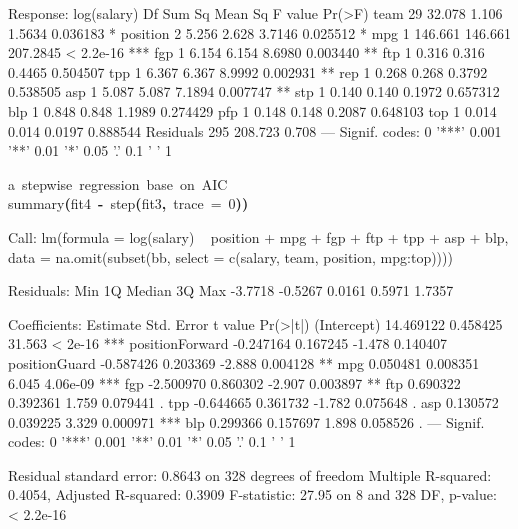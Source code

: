 \documentclass[english]{article}
\newenvironment{dummy}{\par}{\par}
\newcommand{\hlnumber}[1]{\textcolor[rgb]{0.0823529411764706,0.0784313725490196,0.709803921568627}{#1}}%
\newcommand{\hlfunctioncall}[1]{\textcolor[rgb]{1,0,0}{#1}}%
\newcommand{\hlkeyword}[1]{\textcolor[rgb]{0,0,0}{\textbf{#1}}}%
\newcommand{\hlargument}[1]{\textcolor[rgb]{0.694117647058824,0.247058823529412,0.0196078431372549}{#1}}%
\newcommand{\hlcomment}[1]{\textcolor[rgb]{0.8,0.8,0.8}{#1}}%
\newcommand{\hlassignement}[1]{\textcolor[rgb]{0.215686274509804,0.215686274509804,0.384313725490196}{\textbf{#1}}}%
\newcommand{\hlsymbol}[1]{\textcolor[rgb]{0,0,0}{#1}}%
\newcommand{\hlprompt}[1]{\textcolor[rgb]{0,0,0}{#1}}%
\newcommand{\hlstd}[1]{\textcolor[rgb]{0,0,0}{#1}}%
\begin{document}
\begin{dummy}
\begin{Schunk}
\begin{Soutput}
Response: log(salary)
           Df  Sum Sq Mean Sq  F value    Pr(>F)    
team       29  32.078   1.106   1.5634  0.036183 *  
position    2   5.256   2.628   3.7146  0.025512 *  
mpg         1 146.661 146.661 207.2845 < 2.2e-16 ***
fgp         1   6.154   6.154   8.6980  0.003440 ** 
ftp         1   0.316   0.316   0.4465  0.504507    
tpp         1   6.367   6.367   8.9992  0.002931 ** 
rep         1   0.268   0.268   0.3792  0.538505    
asp         1   5.087   5.087   7.1894  0.007747 ** 
stp         1   0.140   0.140   0.1972  0.657312    
blp         1   0.848   0.848   1.1989  0.274429    
pfp         1   0.148   0.148   0.2087  0.648103    
top         1   0.014   0.014   0.0197  0.888544    
Residuals 295 208.723   0.708                       
---
Signif. codes:  0 '***' 0.001 '**' 0.01 '*' 0.05 '.' 0.1 ' ' 1 
\end{Soutput}
\ttfamily\noindent
\hlprompt{\usebox{\hlnormalsizeboxgreaterthan}{\ }}\hlcomment{\usebox{\hlnormalsizeboxhash}\usebox{\hlnormalsizeboxhash}{\ }a{\ }stepwise{\ }regression{\ }base{\ }on{\ }AIC}\mbox{}
\normalfont
\hspace*{\fill}\\
\hlstd{}\ttfamily\noindent
\hlprompt{\usebox{\hlnormalsizeboxgreaterthan}{\ }}\hlfunctioncall{summary}\hlkeyword{(}\hlsymbol{fit4}{\ }\hlassignement{\usebox{\hlnormalsizeboxlessthan}-}{\ }\hlfunctioncall{step}\hlkeyword{(}\hlsymbol{fit3}\hlkeyword{,}{\ }\hlargument{trace}{\ }\hlargument{=}{\ }\hlnumber{0}\hlkeyword{)}\hlkeyword{)}\mbox{}
\normalfont
\hspace*{\fill}\\
\hlstd{}\begin{Soutput}
Call:
lm(formula = log(salary) ~ position + mpg + fgp + ftp + tpp + 
    asp + blp, data = na.omit(subset(bb, select = c(salary, team, 
    position, mpg:top))))

Residuals:
    Min      1Q  Median      3Q     Max 
-3.7718 -0.5267  0.0161  0.5971  1.7357 

Coefficients:
                 Estimate Std. Error t value Pr(>|t|)    
(Intercept)     14.469122   0.458425  31.563  < 2e-16 ***
positionForward -0.247164   0.167245  -1.478 0.140407    
positionGuard   -0.587426   0.203369  -2.888 0.004128 ** 
mpg              0.050481   0.008351   6.045 4.06e-09 ***
fgp             -2.500970   0.860302  -2.907 0.003897 ** 
ftp              0.690322   0.392361   1.759 0.079441 .  
tpp             -0.644665   0.361732  -1.782 0.075648 .  
asp              0.130572   0.039225   3.329 0.000971 ***
blp              0.299366   0.157697   1.898 0.058526 .  
---
Signif. codes:  0 '***' 0.001 '**' 0.01 '*' 0.05 '.' 0.1 ' ' 1 

Residual standard error: 0.8643 on 328 degrees of freedom
Multiple R-squared: 0.4054,	Adjusted R-squared: 0.3909 
F-statistic: 27.95 on 8 and 328 DF,  p-value: < 2.2e-16 
\end{Soutput}

\end{Schunk}
\end{dummy}
\end{document}
